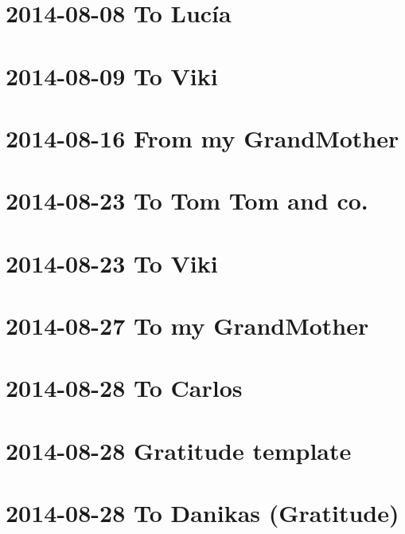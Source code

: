 \documentclass[]{book}
\begin{document}
\hypertarget{to-lucia-5}{%
\section{2014-08-08 To Lucía}\label{to-lucia-5}}

\hypertarget{to-viki-7}{%
\section{2014-08-09 To Viki}\label{to-viki-7}}

\hypertarget{from-my-grandmother}{%
\section{2014-08-16 From my GrandMother}\label{from-my-grandmother}}

\hypertarget{to-tom-tom-and-co.}{%
\section{2014-08-23 To Tom Tom and co.}\label{to-tom-tom-and-co.}}

\hypertarget{to-viki-8}{%
\section{2014-08-23 To Viki}\label{to-viki-8}}

\hypertarget{to-my-grandmother}{%
\section{2014-08-27 To my GrandMother}\label{to-my-grandmother}}

\hypertarget{to-carlos-1}{%
\section{2014-08-28 To Carlos}\label{to-carlos-1}}

\hypertarget{gratitude-template}{%
\section{2014-08-28 Gratitude template}\label{gratitude-template}}

\hypertarget{to-danikas-gratitude}{%
\section{2014-08-28 To Danikas (Gratitude)}\label{to-danikas-gratitude}}
\end{document}
